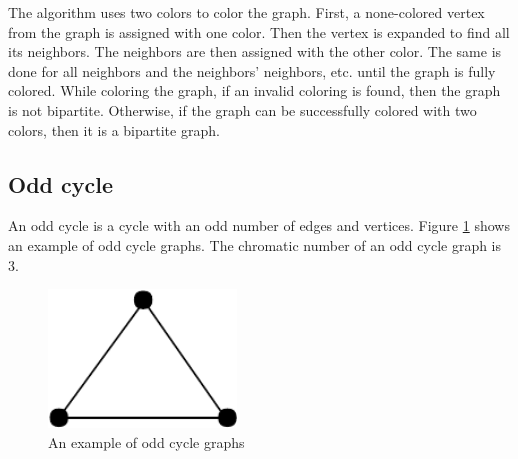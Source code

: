 \documentclass[a4paper]{report}
\begin{document}
%			
			 The algorithm uses two colors to color the graph. First, a none-colored vertex from the graph is assigned with one color. Then the vertex is expanded to find all its neighbors. The neighbors are then assigned with the other color. The same is done for all neighbors and the neighbors' neighbors, etc. until the graph is fully colored. While coloring the graph, if an invalid coloring is found, then the graph is not bipartite. Otherwise, if the graph can be successfully colored with two colors, then it is a bipartite graph.\\

			\subsection{Odd cycle}
			An odd cycle is a cycle with an odd number of edges and vertices. Figure \ref{fig:oddcycle} shows an example of odd cycle graphs. The chromatic number of an odd cycle graph is 3. \\
			
			\begin{figure}[h]
				\centering
				\includegraphics[width=50mm,scale=0.5]{figures/cycle.pdf}
				\caption{An example of odd cycle graphs}
				\label{fig:oddcycle}
			\end{figure}
		
\end{document}
